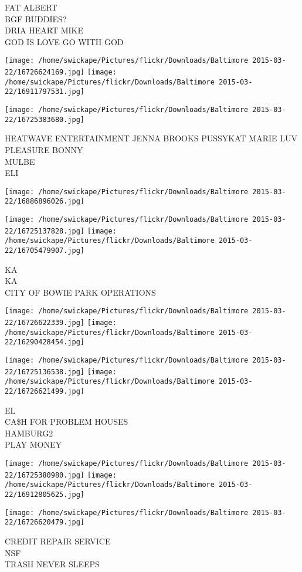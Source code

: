 \documentclass[10pt,letterpaper]{article}
\begin{document}
FAT ALBERT\\
BGF BUDDIES?\\
DRIA HEART MIKE\\
GOD IS LOVE GO WITH GOD
\pagebreak

\texttt{[image: /home/swickape/Pictures/flickr/Downloads/Baltimore 2015-03-22/16726624169.jpg]}
\texttt{[image: /home/swickape/Pictures/flickr/Downloads/Baltimore 2015-03-22/16911797531.jpg]}

\texttt{[image: /home/swickape/Pictures/flickr/Downloads/Baltimore 2015-03-22/16725383680.jpg]}

HEATWAVE ENTERTAINMENT JENNA BROOKS PUSSYKAT MARIE LUV PLEASURE BONNY\\
MULBE\\
ELI
\pagebreak

\texttt{[image: /home/swickape/Pictures/flickr/Downloads/Baltimore 2015-03-22/16886896026.jpg]}

\vspace{0.25in}
\texttt{[image: /home/swickape/Pictures/flickr/Downloads/Baltimore 2015-03-22/16725137828.jpg]}
\texttt{[image: /home/swickape/Pictures/flickr/Downloads/Baltimore 2015-03-22/16705479907.jpg]}

KA\\
KA\\
CITY OF BOWIE PARK OPERATIONS
\pagebreak

\texttt{[image: /home/swickape/Pictures/flickr/Downloads/Baltimore 2015-03-22/16726622339.jpg]}
\texttt{[image: /home/swickape/Pictures/flickr/Downloads/Baltimore 2015-03-22/16290428454.jpg]}

\texttt{[image: /home/swickape/Pictures/flickr/Downloads/Baltimore 2015-03-22/16725136538.jpg]}
\texttt{[image: /home/swickape/Pictures/flickr/Downloads/Baltimore 2015-03-22/16726621499.jpg]}

EL\\
CA\$H FOR PROBLEM HOUSES\\
HAMBURG2\\
PLAY MONEY
\pagebreak

\texttt{[image: /home/swickape/Pictures/flickr/Downloads/Baltimore 2015-03-22/16725380980.jpg]}
\texttt{[image: /home/swickape/Pictures/flickr/Downloads/Baltimore 2015-03-22/16912805625.jpg]}

\vspace{0.25in}
\texttt{[image: /home/swickape/Pictures/flickr/Downloads/Baltimore 2015-03-22/16726620479.jpg]}

CREDIT REPAIR SERVICE\\
NSF\\
TRASH NEVER SLEEPS
\pagebreak
\end{document}
